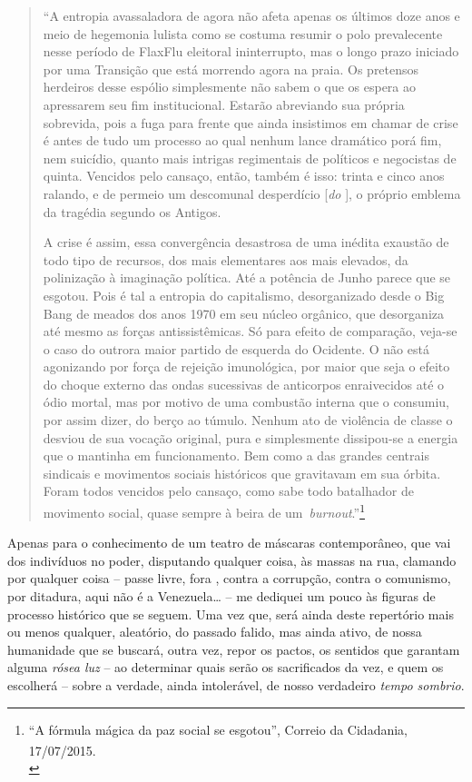 \begin{quote}
``A entropia avassaladora de agora não afeta apenas os últimos doze anos
e meio de hegemonia lulista como se costuma resumir o polo prevalecente
nesse período de FlaxFlu eleitoral ininterrupto, mas o longo prazo
iniciado por uma Transição que está morrendo agora na praia. Os
pretensos herdeiros desse espólio simplesmente não sabem o que os espera
ao apressarem seu fim institucional. Estarão abreviando sua própria
sobrevida, pois a fuga para frente que ainda insistimos em chamar de
crise é antes de tudo um processo ao qual nenhum lance dramático porá
fim, nem suicídio, quanto mais intrigas regimentais de políticos e
negocistas de quinta. Vencidos pelo cansaço, então, também é isso:
trinta e cinco anos ralando, e de permeio um descomunal desperdício
{[}\emph{do }{]}, o próprio emblema da tragédia segundo os Antigos.

A crise é assim, essa convergência desastrosa de uma inédita exaustão de
todo tipo de recursos, dos mais elementares aos mais elevados, da
polinização à imaginação política. Até a potência de Junho parece que se
esgotou. Pois é tal a entropia do capitalismo, desorganizado desde o Big
Bang de meados dos anos 1970 em seu núcleo orgânico, que desorganiza até
mesmo as forças antissistêmicas. Só para efeito de comparação, veja-se o
caso do outrora maior partido de esquerda do Ocidente. O  não está
agonizando por força de rejeição imunológica, por maior que seja o
efeito do choque externo das ondas sucessivas de anticorpos enraivecidos
até o ódio mortal, mas por motivo de uma combustão interna que o
consumiu, por assim dizer, do berço ao túmulo. Nenhum ato de violência
de classe o desviou de sua vocação original, pura e simplesmente
dissipou-se a energia que o mantinha em funcionamento. Bem como a das
grandes centrais sindicais e movimentos sociais históricos que
gravitavam em sua órbita. Foram todos vencidos pelo cansaço, como sabe
todo batalhador de movimento social, quase sempre à beira de
um~\emph{burnout}.''\footnote{``A fórmula mágica da paz social se
  esgotou'', Correio da Cidadania, 17/07/2015.\textsuperscript{\\}}
\end{quote}

Apenas para o conhecimento de um teatro de máscaras contemporâneo, que
vai dos indivíduos no poder, disputando qualquer coisa, às massas na
rua, clamando por qualquer coisa -- passe livre, fora , contra a
corrupção, contra o comunismo, por ditadura, aqui não é a Venezuela…
-- me dediquei um pouco às figuras de processo histórico que se seguem.
Uma vez que, será ainda deste repertório mais ou menos qualquer,
aleatório, do passado falido, mas ainda ativo, de nossa humanidade que
se buscará, outra vez, repor os pactos, os sentidos que garantam alguma
\emph{rósea luz} -- ao determinar quais serão os sacrificados da vez, e
quem os escolherá -- sobre a verdade, ainda intolerável, de nosso
verdadeiro \emph{tempo sombrio}.

